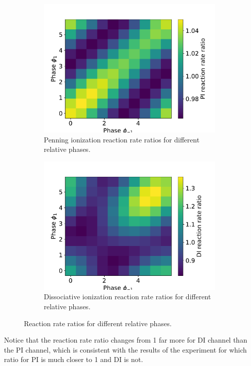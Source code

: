 \documentclass{article}
\begin{document}
    \begin{figure}[H]
        \centering
        \begin{subfigure}{.4\linewidth}
            \centering
            \includegraphics[width=\linewidth]{PI_reaction_ratio_phases_2d.pdf}
            \caption{Penning ionization reaction rate ratios for different relative phases.}
        \end{subfigure}
        \begin{subfigure}{.4\linewidth}
            \centering
            \includegraphics[width=\linewidth]{DI_reaction_ratio_phases_2d.pdf}
            \caption{Dissociative ionization reaction rate ratios for different relative phases.}
        \end{subfigure}     
        \caption{Reaction rate ratios for different relative phases.}
    \end{figure}
    Notice that the reaction rate ratio changes from 1 far more for DI channel than the PI channel, 
    which is consistent with the results of the experiment for which ratio for PI is much closer to 1 and DI is not.
\end{document}
